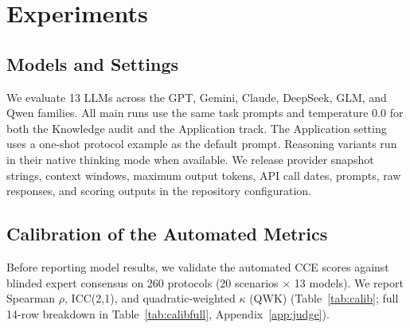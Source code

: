 \documentclass[conference]{IEEEtran}
\begin{document}
\section{Experiments}
\subsection{Models and Settings}
We evaluate 13 LLMs across the GPT, Gemini, Claude, DeepSeek, GLM, and Qwen
families. All main runs use the same task prompts and temperature $0.0$ for both
the Knowledge audit and the Application track. The Application setting uses a
one-shot protocol example as the default prompt. Reasoning variants run in their
native thinking mode when available. We release provider snapshot strings,
context windows, maximum output tokens, API call dates, prompts, raw responses,
and scoring outputs in the repository configuration.

\subsection{Calibration of the Automated Metrics}\label{sec:calib}

Before reporting model results, we validate the automated CCE scores against
blinded expert consensus on 260 protocols (20 scenarios $\times$ 13 models).
We report Spearman $\rho$, ICC(2,1), and quadratic-weighted $\kappa$ (QWK)
(Table~\ref{tab:calib}; full 14-row breakdown in
Table~\ref{tab:calibfull}, Appendix~\ref{app:judge}).

\begin{table}[!t]
    \centering
    \caption{Agreement of automated vs.\ blinded expert-consensus scores on 260
    protocols (20 scenarios $\times$ 13 models). ICC${=}$ICC(2,1);
    QWK${=}$quadratic-weighted $\kappa$. Full
    14-row breakdown in Appendix~\ref{app:judge}.}
    \label{tab:calib}
\end{table}
\end{document}
